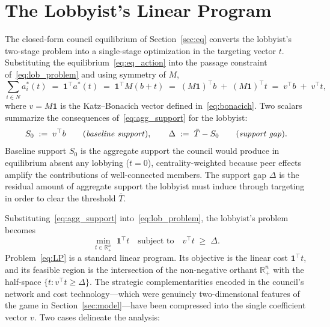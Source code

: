 \documentclass[11pt,letterpaper]{article}
\theoremstyle{plain}
\theoremstyle{definition}
\theoremstyle{remark}
\begin{document}

\section{The Lobbyist's Linear Program}
\label{sec:lp}

The closed-form council equilibrium of Section~\ref{sec:eq} converts the lobbyist's two-stage problem into a single-stage optimization in the targeting vector $t$. Substituting the equilibrium~\eqref{eq:eq_action} into the passage constraint of~\eqref{eq:lob_problem} and using symmetry of $M$,
\begin{equation}
\sum_{i \in N} a_i^*(t) \;=\; \mathbf{1}^\top a^*(t) \;=\; \mathbf{1}^\top M (b + t) \;=\; (M \mathbf{1})^\top b \;+\; (M\mathbf{1})^\top t \;=\; v^\top b \;+\; v^\top t,
\label{eq:agg_support}
\end{equation}
where $v = M\mathbf{1}$ is the Katz--Bonacich vector defined in~\eqref{eq:bonacich}. Two scalars summarize the consequences of~\eqref{eq:agg_support} for the lobbyist:
\begin{equation}
S_0 \;:=\; v^\top b
\qquad\text{(\emph{baseline support})}, \qquad
\Delta \;:=\; \bar T - S_0
\qquad\text{(\emph{support gap})}.
\label{eq:scalars}
\end{equation}
Baseline support $S_0$ is the aggregate support the council would produce in equilibrium absent any lobbying ($t = 0$), centrality-weighted because peer effects amplify the contributions of well-connected members. The support gap $\Delta$ is the residual amount of aggregate support the lobbyist must induce through targeting in order to clear the threshold $\bar T$.

Substituting~\eqref{eq:agg_support} into~\eqref{eq:lob_problem}, the lobbyist's problem becomes
\begin{equation}
\boxed{\;\min_{t \in \mathbb{R}^n_+}\; \mathbf{1}^\top t \quad \text{subject to} \quad v^\top t \;\geq\; \Delta. \;}
\label{eq:LP}
\end{equation}
Problem~\eqref{eq:LP} is a standard linear program. Its objective is the linear cost $\mathbf{1}^\top t$, and its feasible region is the intersection of the non-negative orthant $\mathbb{R}^n_+$ with the half-space $\{t : v^\top t \geq \Delta\}$. The strategic complementarities encoded in the council's network and cost technology---which were genuinely two-dimensional features of the game in Section~\ref{sec:model}---have been compressed into the single coefficient vector $v$. Two cases delineate the analysis:
\end{document}
